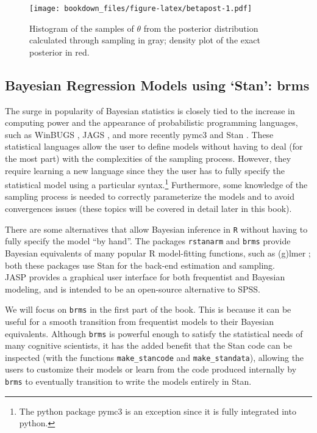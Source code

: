 \documentclass[12pt,]{krantz}
\theoremstyle{definition}
\theoremstyle{definition}
\theoremstyle{definition}
\theoremstyle{remark}
\begin{document}
\begin{figure}
\centering
\texttt{[image: bookdown\_files/figure-latex/betapost-1.pdf]}
\caption{\label{fig:betapost}Histogram of the samples of \(\theta\) from the posterior distribution calculated through sampling in gray; density plot of the exact posterior in red.}
\end{figure}

\hypertarget{bayesian-regression-models-using-stan-brms}{%
\subsection{Bayesian Regression Models using `Stan': brms}\label{bayesian-regression-models-using-stan-brms}}

The surge in popularity of Bayesian statistics is closely tied to the increase in computing power and the appearance of probabilistic programming languages, such as WinBUGS \citep{lunn2000winbugs}, JAGS \citep{plummer2016jags}, and more recently pymc3 \citep{Salvatier2016} and Stan \citep{carpenter2017stan}. These statistical languages allow the user to define models without having to deal (for the most part) with the complexities of the sampling process. However, they require learning a new language since they the user has to fully specify the statistical model using a particular syntax.\footnote{The python package pymc3 is an exception since it is fully integrated into python.} Furthermore, some knowledge of the sampling process is needed to correctly parameterize the models and to avoid convergences issues (these topics will be covered in detail later in this book).

There are some alternatives that allow Bayesian inference in \texttt{R} without having to fully specify the model ``by hand''. The packages \texttt{rstanarm} \citep{rstanarm} and \texttt{brms} \citep{R-brms} provide Bayesian equivalents of many popular R model-fitting functions, such as (g)lmer \citep{lme4new}; both these packages use Stan for the back-end estimation and sampling.\\
JASP \citep{JASP2019} provides a graphical user interface for both frequentist and Bayesian modeling, and is intended to be an open-source alternative to SPSS.

We will focus on \texttt{brms} in the first part of the book. This is because it can be useful for a smooth transition from frequentist models to their Bayesian equivalents. Although \texttt{brms} is powerful enough to satisfy the statistical needs of many cognitive scientists, it has the added benefit that the Stan code can be inspected (with the functions \texttt{make\_stancode} and \texttt{make\_standata}), allowing the users to customize their models or learn from the code produced internally by \texttt{brms} to eventually transition to write the models entirely in Stan.
\end{document}
